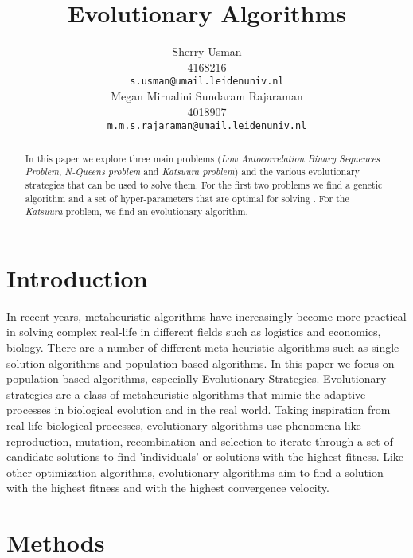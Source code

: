 \documentclass{article}
\title{Evolutionary Algorithms}
\author{
 Sherry Usman\\
  4168216\\
  \texttt{s.usman@umail.leidenuniv.nl}\\
   \And
 Megan Mirnalini Sundaram Rajaraman\\
  4018907\\
  \texttt{m.m.s.rajaraman@umail.leidenuniv.nl} \\
}
\begin{document}
\maketitle
 \begin{abstract}
In this paper we explore three main problems (\emph{Low Autocorrelation Binary Sequences Problem}, \emph{N-Queens problem} and \emph{Katsuura problem}) and the various evolutionary strategies that can be used to solve them. For the first two problems we find a genetic algorithm and a set of hyper-parameters that are optimal for solving . For the \emph{Katsuura} problem,  we find an evolutionary algorithm.
\end{abstract}




\section{Introduction}\label{sec:intro}
In recent years, metaheuristic algorithms have increasingly become more practical in solving complex real-life in different fields such as logistics and economics, biology.  There are a number of different meta-heuristic algorithms such as single solution algorithms and population-based algorithms. In this paper we focus on population-based algorithms, especially Evolutionary Strategies. Evolutionary strategies are a class of metaheuristic algorithms that mimic the adaptive processes in biological evolution and in the real world. Taking inspiration from real-life biological processes, evolutionary algorithms use phenomena like reproduction, mutation, recombination and selection to iterate through a set of candidate solutions to find 'individuals' or solutions with the highest fitness. Like other optimization algorithms, evolutionary algorithms aim to find a solution with the highest fitness and with the highest convergence velocity. \\
\section{Methods}
\end{document}
